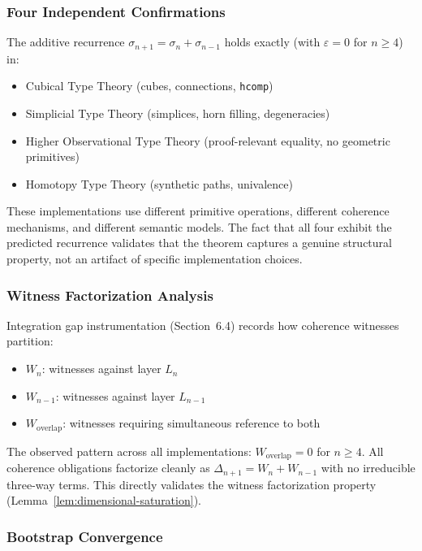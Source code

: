 \documentclass[11pt]{article}
\theoremstyle{definition}
\theoremstyle{remark}
\begin{document}
\subsubsection{Four Independent Confirmations}

The additive recurrence $\sigma_{n+1} = \sigma_n + \sigma_{n-1}$ holds exactly (with $\varepsilon = 0$ for $n \geq 4$) in:
\begin{itemize}
\item Cubical Type Theory (cubes, connections, \texttt{hcomp})
\item Simplicial Type Theory (simplices, horn filling, degeneracies)
\item Higher Observational Type Theory (proof-relevant equality, no geometric primitives)
\item Homotopy Type Theory (synthetic paths, univalence)
\end{itemize}

These implementations use different primitive operations, different coherence mechanisms, and
different semantic models. The fact that all four exhibit the predicted recurrence validates that
the theorem captures a genuine structural property, not an artifact of specific implementation
choices.

\subsubsection{Witness Factorization Analysis}

Integration gap instrumentation (Section~6.4) records how coherence witnesses partition:
\begin{itemize}
\item $W_n$: witnesses against layer $L_n$
\item $W_{n-1}$: witnesses against layer $L_{n-1}$
\item $W_{\text{overlap}}$: witnesses requiring simultaneous reference to both
\end{itemize}

The observed pattern across all implementations: $W_{\text{overlap}} = 0$ for $n \geq 4$. All coherence
obligations factorize cleanly as $\Delta_{n+1} = W_n + W_{n-1}$ with no irreducible three-way terms.
This directly validates the witness factorization property (Lemma~\ref{lem:dimensional-saturation}).

\subsubsection{Bootstrap Convergence}
\end{document}

